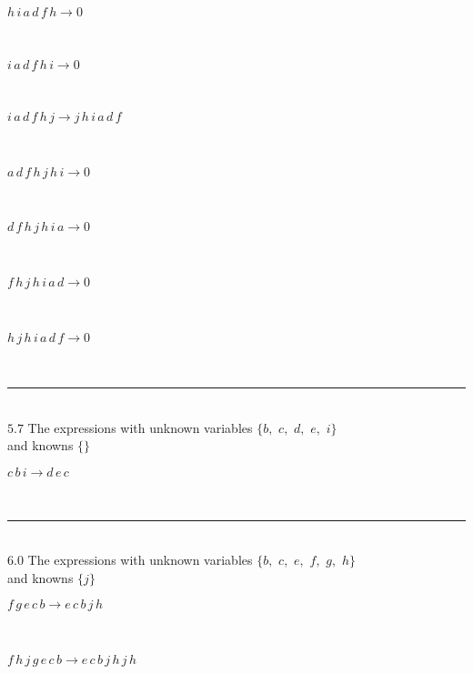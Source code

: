\documentclass[rep10,leqno]{report}
\begin{document}
\begin{minipage}{6in}
$
h\,
 i\,
 a\,
 d\,
 f\,
 h\rightarrow 0
$
\end{minipage}\medskip \\
\begin{minipage}{6in}
$
i\,
 a\,
 d\,
 f\,
 h\,
 i\rightarrow 0
$
\end{minipage}\medskip \\
\begin{minipage}{6in}
$
i\,
 a\,
 d\,
 f\,
 h\,
 j\rightarrow j\,
 h\,
 i\,
 a\,
 d\,
 f
$
\end{minipage}\medskip \\
\begin{minipage}{6in}
$
a\,
 d\,
 f\,
 h\,
 j\,
 h\,
 i\rightarrow 0
$
\end{minipage}\medskip \\
\begin{minipage}{6in}
$
d\,
 f\,
 h\,
 j\,
 h\,
 i\,
 a\rightarrow 0
$
\end{minipage}\medskip \\
\begin{minipage}{6in}
$
f\,
 h\,
 j\,
 h\,
 i\,
 a\,
 d\rightarrow 0
$
\end{minipage}\medskip \\
\begin{minipage}{6in}
$
h\,
 j\,
 h\,
 i\,
 a\,
 d\,
 f\rightarrow 0
$
\end{minipage}\\
\rule[3pt]{6in}{.7pt}\\
$5.7$  The expressions with unknown variables $\{b,
$ $
c,
$ $
d,
$ $
e,
$ $
i\}$\\
and knowns $\{\}$\smallskip\\
\begin{minipage}{6in}
$
c\,
 b\,
 i\rightarrow d\,
 e\,
 c
$
\end{minipage}\\
\rule[3pt]{6in}{.7pt}\\
$6.0$  The expressions with unknown variables $\{b,
$ $
c,
$ $
e,
$ $
f,
$ $
g,
$ $
h\}$\\
and knowns $\{j\}$\smallskip\\
\begin{minipage}{6in}
$
f\,
 g\,
 e\,
 c\,
 b\rightarrow e\,
 c\,
 b\,
 j\,
 h
$
\end{minipage}\medskip \\
\begin{minipage}{6in}
$
f\,
 h\,
 j\,
 g\,
 e\,
 c\,
 b\rightarrow e\,
 c\,
 b\,
 j\,
 h\,
 j\,
 h
$
\end{minipage}\\
\end{document}
